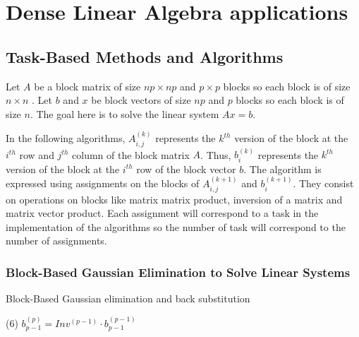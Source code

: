 \chapter{Dense Linear Algebra applications \label{chap:exp_dense}}
\graphicspath{{chapters/exp_dense/}}

\section{Task-Based Methods and Algorithms}


Let $A$ be a block matrix of size $np \times np$ and $p \times p$ blocks so each block is of size $n \times n$ .
Let $b$ and $x$ be block vectors of size $np$ and $p$ blocks so each block is of size $n$.
The goal here is to solve the linear system $Ax=b$.

In the following algorithms, $A_{i,j}^{(k)}$ represents the $k^{th}$ version of the block at the $i^{th}$ row and $j^{th}$ column of the block matrix $A$.
Thus, $b_i^{(k)}$ represents the $k^{th}$ version of the block at the $i^{th}$ row of the block vector $b$.
The algorithm is expressed using assignments on the blocks of $A_{i,j}^{(k+1)}$ and $b_i^{(k+1)}$.
They consist on operations on blocks like matrix matrix product, inversion of a matrix and matrix vector product.
Each assignment will correspond to a task in the implementation of the algorithms so the number of task will correspond to the number of assignments.




\subsection{Block-Based Gaussian Elimination to Solve Linear Systems}

\begin{algorithm}[h]
	\DontPrintSemicolon
	\caption{Block-Based Gaussian elimination and back substitution \label{alg:bg_el_data_dep}}

	(6) $b_{p-1}^{(p)} = Inv^{(p-1)} \cdot b_{p-1}^{(p-1)}$ \;

\end{algorithm}

